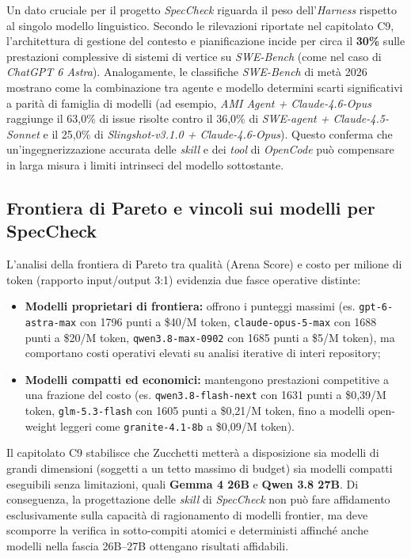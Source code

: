 \documentclass[a4paper, 11pt]{article}
\begin{document}
Un dato cruciale per il progetto \textit{SpecCheck} riguarda il peso dell'\textit{Harness} rispetto al singolo modello linguistico. Secondo le rilevazioni riportate nel capitolato C9, l'architettura di gestione del contesto e pianificazione incide per circa il \textbf{30\%} sulle prestazioni complessive di sistemi di vertice su \textit{SWE-Bench} (come nel caso di \textit{ChatGPT 6 Astra}). Analogamente, le classifiche \textit{SWE-Bench} di metà 2026 mostrano come la combinazione tra agente e modello determini scarti significativi a parità di famiglia di modelli (ad esempio, \textit{AMI Agent + Claude-4.6-Opus} raggiunge il 63,0\% di issue risolte contro il 36,0\% di \textit{SWE-agent + Claude-4.5-Sonnet} e il 25,0\% di \textit{Slingshot-v3.1.0 + Claude-4.6-Opus}). Questo conferma che un'ingegnerizzazione accurata delle \textit{skill} e dei \textit{tool} di \textit{OpenCode} può compensare in larga misura i limiti intrinseci del modello sottostante.

\subsection{Frontiera di Pareto e vincoli sui modelli per SpecCheck}
L'analisi della frontiera di Pareto tra qualità (Arena Score) e costo per milione di token (rapporto input/output 3:1) evidenzia due fasce operative distinte:
\begin{itemize}[noitemsep]
    \item \textbf{Modelli proprietari di frontiera:} offrono i punteggi massimi (es. \texttt{gpt-6-astra-max} con 1796 punti a \$40/M token, \texttt{claude-opus-5-max} con 1688 punti a \$20/M token, \texttt{qwen3.8-max-0902} con 1685 punti a \$5/M token), ma comportano costi operativi elevati su analisi iterative di interi repository;
    \item \textbf{Modelli compatti ed economici:} mantengono prestazioni competitive a una frazione del costo (es. \texttt{qwen3.8-flash-next} con 1631 punti a \$0,39/M token, \texttt{glm-5.3-flash} con 1605 punti a \$0,21/M token, fino a modelli open-weight leggeri come \texttt{granite-4.1-8b} a \$0,09/M token).
\end{itemize}

Il capitolato C9 stabilisce che Zucchetti metterà a disposizione sia modelli di grandi dimensioni (soggetti a un tetto massimo di budget) sia modelli compatti eseguibili senza limitazioni, quali \textbf{Gemma 4 26B} e \textbf{Qwen 3.8 27B}. Di conseguenza, la progettazione delle \textit{skill} di \textit{SpecCheck} non può fare affidamento esclusivamente sulla capacità di ragionamento di modelli frontier, ma deve scomporre la verifica in sotto-compiti atomici e deterministi affinché anche modelli nella fascia 26B--27B ottengano risultati affidabili.
\end{document}
